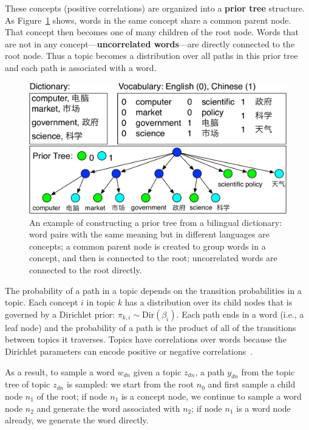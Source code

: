 These concepts (positive correlations) are organized into a {\bf prior
  tree} structure. As Figure~\ref{fig:prior_trees} shows, words in the
same concept share a common parent node. That concept then becomes
one of many children of the root node.  Words that are not in any
concept---{\bf uncorrelated words}---are directly connected to the
root node. Thus a topic becomes a distribution over all paths in this
prior tree and each path is associated with a word.

\begin{figure}
\centering
\includegraphics[width=0.9\linewidth]{figures/correlations_tree-crop.pdf}
\vspace{-3mm}
\caption[Constructing prior tree from a bilingual dictionary]{An example of constructing a prior tree from a
  bilingual dictionary: word pairs with the same meaning but in
  different languages are concepts; a common parent node is created to
  group words in a concept, and then is connected to the root;
  uncorrelated words are connected to the root directly.}
\label{fig:prior_trees}
\end{figure}

The probability of a path in a topic depends on the transition
probabilities in a topic.  Each concept $i$ in topic $k$ has a
distribution over its child nodes that is governed by a Dirichlet prior:
$\pi_{k,i} \sim \text{Dir}(\beta_{i})$.  Each path ends in a word
(i.e., a leaf node) and the probability of a path is the product of
all of the transitions between topics it traverses. Topics have
correlations over words because the Dirichlet parameters can encode
positive or negative correlations~\citep{andrzejewski-09}.

As a result, to sample a word $w_{dn}$ given a topic $z_{dn}$, a path
$y_{dn}$ from the topic tree of topic $z_{dn}$ is sampled: we start
from the root $n_0$ and first sample a child node $n_1$ of the root;
if node $n_1$ is a concept node, we continue to sample a word node
$n_2$ and generate the word associated with $n_2$; if node $n_1$ is a
word node already, we generate the word directly.

